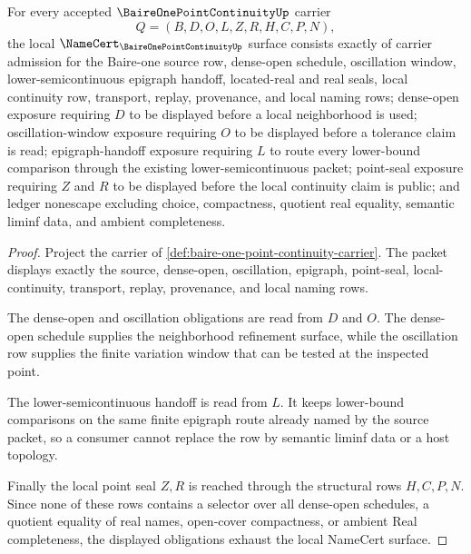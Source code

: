 \begin{theorem}
\label{thm:baire-one-point-continuity-namecert-obligations}
For every accepted $\BaireOnePointContinuityUp$ carrier
$$
Q=(B,D,O,L,Z,R,H,C,P,N),
$$
the local $\NameCert_{\BaireOnePointContinuityUp}$ surface consists exactly of carrier admission for the Baire-one source row, dense-open schedule, oscillation window, lower-semicontinuous epigraph handoff, located-real and real seals, local continuity row, transport, replay, provenance, and local naming rows; dense-open exposure requiring $D$ to be displayed before a local neighborhood is used; oscillation-window exposure requiring $O$ to be displayed before a tolerance claim is read; epigraph-handoff exposure requiring $L$ to route every lower-bound comparison through the existing lower-semicontinuous packet; point-seal exposure requiring $Z$ and $R$ to be displayed before the local continuity claim is public; and ledger nonescape excluding choice, compactness, quotient real equality, semantic liminf data, and ambient completeness.
\end{theorem}
\begin{proof}
Project the carrier of \autoref{def:baire-one-point-continuity-carrier}. The packet displays exactly the source, dense-open, oscillation, epigraph, point-seal, local-continuity, transport, replay, provenance, and local naming rows.

The dense-open and oscillation obligations are read from $D$ and $O$. The dense-open schedule supplies the neighborhood refinement surface, while the oscillation row supplies the finite variation window that can be tested at the inspected point.

The lower-semicontinuous handoff is read from $L$. It keeps lower-bound comparisons on the same finite epigraph route already named by the source packet, so a consumer cannot replace the row by semantic liminf data or a host topology.

Finally the local point seal $Z,R$ is reached through the structural rows $H,C,P,N$. Since none of these rows contains a selector over all dense-open schedules, a quotient equality of real names, open-cover compactness, or ambient Real completeness, the displayed obligations exhaust the local NameCert surface.
\end{proof}

